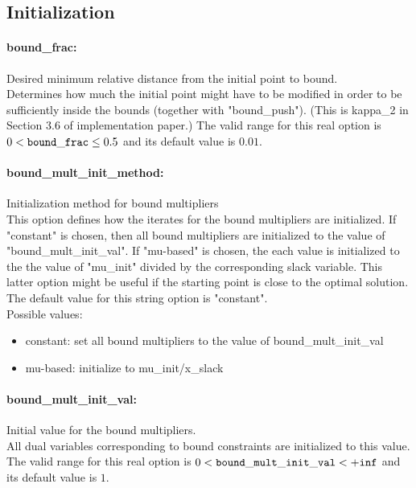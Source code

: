\subsection{Initialization}
\label{sec:Initialization}
\paragraph{bound\_frac:}\label{opt:bound_frac} Desired minimum relative distance from the initial point to bound. \\
 Determines how much the initial point might have to be modified in order to be sufficiently inside the bounds (together with "bound\_push").  (This is kappa\_2 in Section 3.6 of implementation paper.) The valid range for this real option is 
$0 <  {\tt bound\_frac } \le 0.5$
and its default value is $0.01$.


\paragraph{bound\_mult\_init\_method:}\label{opt:bound_mult_init_method} Initialization method for bound multipliers \\
 This option defines how the iterates for the bound multipliers are initialized.  If "constant" is chosen, then all bound multipliers are initialized to the value of "bound\_mult\_init\_val".  If "mu-based" is chosen, the each value is initialized to the the value of "mu\_init" divided by the corresponding slack variable.  This latter option might be useful if the starting point is close to the optimal solution. The default value for this string option is "constant".
\\ 
Possible values:
\begin{itemize}
   \item constant: set all bound multipliers to the value of bound\_mult\_init\_val
   \item mu-based: initialize to mu\_init/x\_slack
\end{itemize}

\paragraph{bound\_mult\_init\_val:}\label{opt:bound_mult_init_val} Initial value for the bound multipliers. \\
 All dual variables corresponding to bound constraints are initialized to this value. The valid range for this real option is 
$0 <  {\tt bound\_mult\_init\_val } <  {\tt +inf}$
and its default value is $1$.


